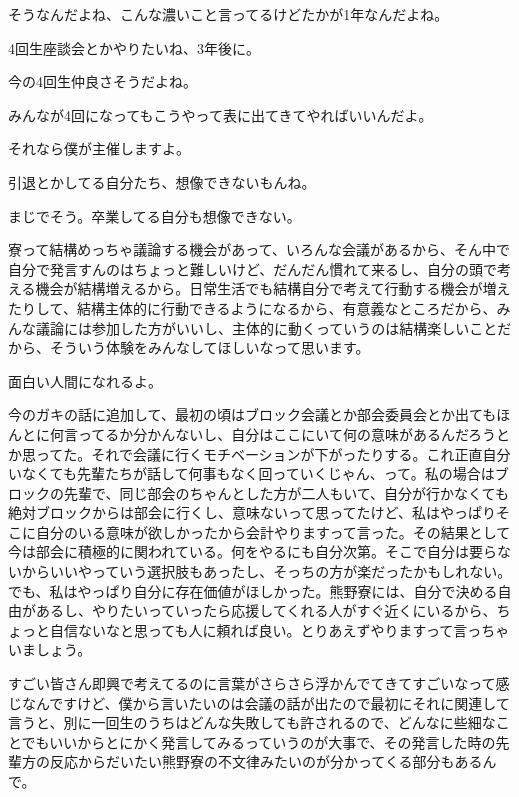 \begin{multicols}{2}
そうなんだよね、こんな濃いこと言ってるけどたかが1年なんだよね。

4回生座談会とかやりたいね、3年後に。

今の4回生仲良さそうだよね。

みんなが4回になってもこうやって表に出てきてやればいいんだよ。

それなら僕が主催しますよ。

引退とかしてる自分たち、想像できないもんね。

まじでそう。卒業してる自分も想像できない。

寮って結構めっちゃ議論する機会があって、いろんな会議があるから、そん中で自分で発言すんのはちょっと難しいけど、だんだん慣れて来るし、自分の頭で考える機会が結構増えるから。日常生活でも結構自分で考えて行動する機会が増えたりして、結構主体的に行動できるようになるから、有意義なところだから、みんな議論には参加した方がいいし、主体的に動くっていうのは結構楽しいことだから、そういう体験をみんなしてほしいなって思います。

面白い人間になれるよ。

今のガキの話に追加して、最初の頃はブロック会議とか部会委員会とか出てもほんとに何言ってるか分かんないし、自分はここにいて何の意味があるんだろうとか思ってた。それで会議に行くモチベーションが下がったりする。これ正直自分いなくても先輩たちが話して何事もなく回っていくじゃん、って。私の場合はブロックの先輩で、同じ部会のちゃんとした方が二人もいて、自分が行かなくても絶対ブロックからは部会に行くし、意味ないって思ってたけど、私はやっぱりそこに自分のいる意味が欲しかったから会計やりますって言った。その結果として今は部会に積極的に関われている。何をやるにも自分次第。そこで自分は要らないからいいやっていう選択肢もあったし、そっちの方が楽だったかもしれない。でも、私はやっぱり自分に存在価値がほしかった。熊野寮には、自分で決める自由があるし、やりたいっていったら応援してくれる人がすぐ近くにいるから、ちょっと自信ないなと思っても人に頼れば良い。とりあえずやりますって言っちゃいましょう。

すごい皆さん即興で考えてるのに言葉がさらさら浮かんでてきてすごいなって感じなんですけど、僕から言いたいのは会議の話が出たので最初にそれに関連して言うと、別に一回生のうちはどんな失敗しても許されるので、どんなに些細なことでもいいからとにかく発言してみるっていうのが大事で、その発言した時の先輩方の反応からだいたい熊野寮の不文律みたいのが分かってくる部分もあるんで。


\end{multicols}
